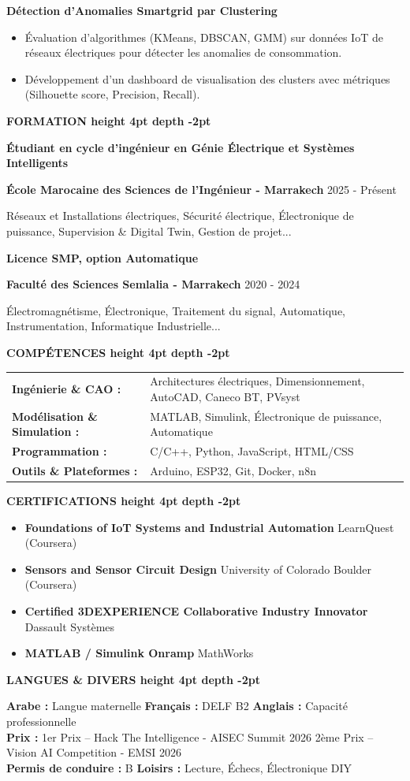 \documentclass[10pt,a4paper]{../../altacv}
\renewcommand{\cvsection}[2][]{%
  \medskip%
  {\color{heading}\LARGE\bfseries #2 \hspace{0.2em}\leaders\vrule height 4pt depth -2pt\hfill\mbox{}}\par\smallskip
}
\renewcommand{\cvevent}[4]{%
  {\large\bfseries\color{accent}#1\par}
  \smallskip\normalsize
  \ifstrequal{#2}{}{}{%
    \textbf{\color{emphasis}#2\ifstrequal{#4}{}{}{ - #4}}%
  }%
  \hfill
  \ifstrequal{#3}{}{}{{\small#3}}%
  \par\smallskip
}
\begin{document}
{\large\bfseries\color{accent} Détection d'Anomalies Smartgrid par Clustering}\\[0.05cm]
\begin{itemize}
  \item Évaluation d'algorithmes (KMeans, DBSCAN, GMM) sur données IoT de réseaux électriques pour détecter les anomalies de consommation.
  \item Développement d'un dashboard de visualisation des clusters avec métriques (Silhouette score, Precision, Recall).
\end{itemize}

\cvsection{FORMATION}
\cvevent{Étudiant en cycle d'ingénieur en Génie Électrique et Systèmes Intelligents}{École Marocaine des Sciences de l'Ingénieur}{2025 - Présent}{Marrakech}
\small Réseaux et Installations électriques, Sécurité électrique, Électronique de puissance, Supervision \& Digital Twin, Gestion de projet...

\cvevent{Licence SMP, option Automatique}{Faculté des Sciences Semlalia}{2020 - 2024}{Marrakech}
\small Électromagnétisme, Électronique, Traitement du signal, Automatique, Instrumentation, Informatique Industrielle...

\cvsection{COMPÉTENCES}
\begin{tabular}{@{}ll@{}}
\textbf{Ingénierie \& CAO :} & Architectures électriques, Dimensionnement, AutoCAD, Caneco BT, PVsyst \\[1pt]
\textbf{Modélisation \& Simulation :} & MATLAB, Simulink, Électronique de puissance, Automatique \\[1pt]
\textbf{Programmation :} & C/C++, Python, JavaScript, HTML/CSS \\[1pt]
\textbf{Outils \& Plateformes :} & Arduino, ESP32, Git, Docker, n8n \\
\end{tabular}

\cvsection{CERTIFICATIONS}
\begin{itemize}[leftmargin=*, label=\textbullet, itemsep=2pt]
  \item \textbf{Foundations of IoT Systems and Industrial Automation} \hfill {\color{emphasis}LearnQuest (Coursera)}
  \item \textbf{Sensors and Sensor Circuit Design} \hfill {\color{emphasis}University of Colorado Boulder (Coursera)}
  \item \textbf{Certified 3DEXPERIENCE Collaborative Industry Innovator} \hfill {\color{emphasis}Dassault Systèmes}
  \item \textbf{MATLAB / Simulink Onramp} \hfill {\color{emphasis}MathWorks}
\end{itemize}

\cvsection{LANGUES \& DIVERS}
\textbf{Arabe :} Langue maternelle \hfill \textbf{Français :} DELF B2 \hfill \textbf{Anglais :} Capacité professionnelle\\[2pt]
\textbf{Prix :} 1er Prix -- Hack The Intelligence - AISEC Summit 2026 \hfill 2ème Prix -- Vision AI Competition - EMSI 2026\\[2pt]
\textbf{Permis de conduire :} B \hfill \textbf{Loisirs :} Lecture, Échecs, Électronique DIY
\end{document}
